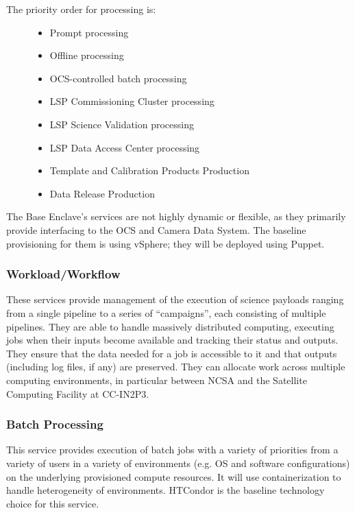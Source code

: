 \documentclass[]{article}
\providecommand{\tightlist}{%
  \setlength{\itemsep}{0pt}\setlength{\parskip}{0pt}}
\begin{document}
\begin{description}
\item[The priority order for processing is:]
\begin{itemize}
\tightlist
\item
  Prompt processing
\item
  Offline processing
\item
  OCS-controlled batch processing
\item
  LSP Commissioning Cluster processing
\item
  LSP Science Validation processing
\item
  LSP Data Access Center processing
\item
  Template and Calibration Products Production
\item
  Data Release Production
\end{itemize}
\end{description}

The Base Enclave's services are not highly dynamic or flexible, as they
primarily provide interfacing to the OCS and Camera Data System. The
baseline provisioning for them is using vSphere; they will be deployed
using Puppet.

\subsubsection{Workload/Workflow}\label{workloadworkflow}

These services provide management of the execution of science payloads
ranging from a single pipeline to a series of ``campaigns'', each
consisting of multiple pipelines. They are able to handle massively
distributed computing, executing jobs when their inputs become available
and tracking their status and outputs. They ensure that the data needed
for a job is accessible to it and that outputs (including log files, if
any) are preserved. They can allocate work across multiple computing
environments, in particular between NCSA and the Satellite Computing
Facility at CC-IN2P3.

\subsubsection{Batch Processing}\label{batch-processing}

This service provides execution of batch jobs with a variety of
priorities from a variety of users in a variety of environments (e.g. OS
and software configurations) on the underlying provisioned compute
resources. It will use containerization to handle heterogeneity of
environments. HTCondor is the baseline technology choice for this
service.
\end{document}
